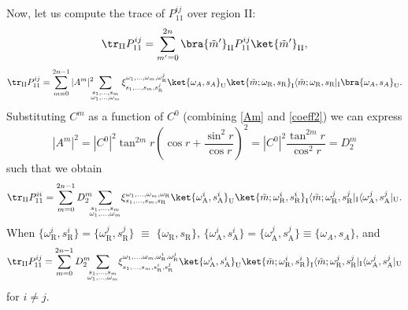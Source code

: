 Now, let us compute the trace of $P^{ij}_{11}$ over region II:
\begin{equation}\label{traza11}
\tr_{\text{II}} P^{ij}_{11}=\sum_{m'=0}^{2n}\bra{\tilde m'}_\text{II}P^{ij}_{11}\ket{\tilde m'}_\text{II},
\end{equation}
\begin{equation}\label{t11pre}
 \tr_{\text{II}} P_{11}^{ij}=\sum_{m=0}^{2n-1}|A^m|^2 \!\!\!\sum_{\substack{s_1,\dots,s_m\\\omega_1,\dots,\omega_m}}\xi_{s_1,\dots,s_m,s^j_\text{R}}^{\omega_1,\dots,\omega_m,\omega^j_\text{R}}\ket{\omega_A,s_A}_{\text{U}}\ket{\tilde m;\omega_\text{R},s_\text{R}}_{\text{I}}\langle{\tilde m;\omega_\text{R},s_\text{R}}|_{\text{I}}\bra{\omega_A,s_A}_{\text{U}}.
\end{equation}
Substituting $C^m$ as a function of $C^0$ (combining \eqref{Am} and \eqref{coeff2}) we can express
\begin{equation}
|A^m|^2=|C^0|^2 \tan^{2m}r\left(\cos r+\frac{\sin^2 r}{\cos r}\right)^2=|C^0|^2 \frac{\tan^{2m}r}{\cos^2 r}=D^m_2
\end{equation}
such that we obtain
\begin{equation}\label{t11}
\tr_{\text{II}} P^{ii}_{11}=\sum_{m=0}^{2n-1}D^m_2 \!\!\!\sum_{\substack{s_1,\dots,s_m\\\omega_1,\dots,\omega_m}}\!\xi_{s_1,\dots,s_m,s_\text{R}}^{\omega_1,\dots,\omega_m,\omega_\text{R}}\ket{\omega^i_\text{A},s^i_\text{A}}_{\text{U}}\ket{\tilde m;\omega^i_\text{R},s^i_\text{R}}_{\text{I}}\langle{\tilde m;\omega^j_\text{R},s^j_\text{R}}|_{\text{I}}\langle{\omega^j_\text{A},s^j_\text{A}}|_{\text{U}}.
\end{equation}
When $\{\omega^i_\text{R},s^i_\text{R}\}=\{\omega^j_\text{R},s^j_\text{R}\}$ $\equiv$ $\{\omega_\text{R},s_\text{R}\}$, $\{\omega^i_\text{A},s^i_\text{A}\}=\{\omega^j_\text{A},s^j_\text{A}\}\equiv \{\omega_A,s_A\}$, and
\begin{equation}\label{t112}
\tr_{\text{II}} P^{ij}_{11}=\sum_{m=0}^{2n-1}D^m_2 \!\!\!\sum_{\substack{s_1,\dots,s_m\\\omega_1,\dots,\omega_m}}\!\xi_{s_1,\dots,s_m,s^i_\text{R},s^j_\text{R}}^{\omega_1,\dots,\omega_m,\omega^i_\text{R},\omega^j_\text{R}}\ket{\omega^i_\text{A},s^i_\text{A}}_{\text{U}}\ket{\tilde m;\omega^i_\text{R},s^i_\text{R}}_{\text{I}}\langle{\tilde m;\omega^j_\text{R},s^j_\text{R}}|_{\text{I}}\langle{\omega^j_\text{A},s^j_\text{A}}|_{\text{U}}
\end{equation}
for $i\neq j$.

